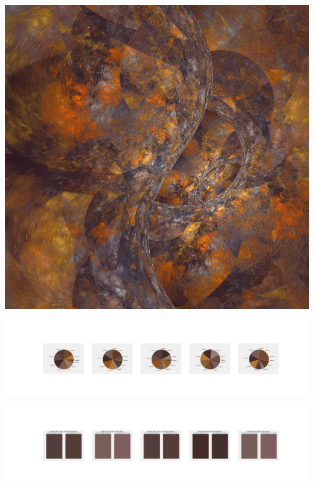 \documentclass[11pt]{article}
\begin{document}
\begin{landscape}
    \begin{center}
    \includegraphics[width=\textwidth]{./nbimg/file (263).jpg}
    \end{center}

    \begin{center}
    \includegraphics[width=250mm]{./nbimg/pie-182.jpg}
    \end{center}

    \begin{center}
    \includegraphics[width=250mm]{./nbimg/peak-182.jpg}
    \end{center}
    


\end{landscape}
\end{document}
